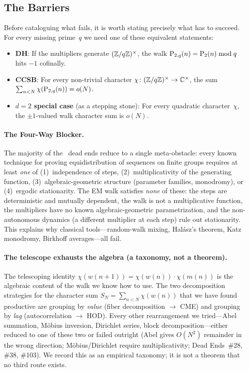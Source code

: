 \subsection{The Barriers}
\label{sec:four-way}

Before cataloguing what fails, it is worth stating precisely what has to
succeed.  For every missing prime~$q$ we need one of these equivalent
statements:
\begin{itemize}[nosep]
\item \textbf{DH}: If the multipliers generate $(\mathbb{Z}/q\mathbb{Z})^\times$,
  the walk $\mathrm{P}_{2,q}(n) = \mathrm{P}_{2}(n) \bmod q$ hits $-1$ cofinally.
\item \textbf{CCSB}: For every non-trivial character
  $\chi \colon (\mathbb{Z}/q\mathbb{Z})^\times \to \mathbb{C}^\times$, the sum
  $\sum_{n < N} \chi(\mathrm{P}_{2,q}(n)) = o(N)$.
\item \textbf{$d{=}2$ special case} (as a stepping stone): For every
  quadratic character~$\chi$, the $\pm 1$-valued walk character sum is
  $o(N)$.
\end{itemize}


\paragraph{The Four-Way Blocker.}
The majority of the \DEentries~dead ends reduce to a single meta-obstacle:
every known technique for proving equidistribution of sequences on
finite groups requires at least \emph{one} of (1)~independence of
steps, (2)~multiplicativity of the generating function,
(3)~algebraic-geometric structure (parameter families, monodromy),
or (4)~ergodic stationarity.  The EM walk satisfies \emph{none} of
these: the steps are deterministic and mutually dependent, the walk
is not a multiplicative function, the multipliers have no known
algebraic-geometric parametrization, and the non-autonomous dynamics
(a different multiplier at each step) rule out stationarity.  This
explains why classical tools---random-walk mixing, Hal\'asz's theorem,
Katz monodromy, Birkhoff averages---all fail.


\paragraph{The telescope exhausts the algebra (a taxonomy, not a theorem).}
The telescoping identity $\chi(w(n{+}1)) = \chi(w(n)) \cdot
\chi(m(n))$ is the algebraic content of the walk we know how to use.
The two decomposition strategies for the character sum $S_N =
\sum_{n<N} \chi(w(n))$ that we have found productive are grouping by
\emph{value} (fiber decomposition $\to$ CME) and grouping by \emph{lag}
(autocorrelation $\to$ HOD).  Every other rearrangement we tried---Abel
summation, M\"obius inversion, Dirichlet series, block
decomposition---either reduced to one of these two or failed outright
(Abel gives $O(N^2)$ remainder in the wrong direction; M\"obius/Dirichlet
require multiplicativity; Dead Ends~\#28, \#38, \#103).  We record this as
an empirical taxonomy; it is not a theorem that no third route exists.

